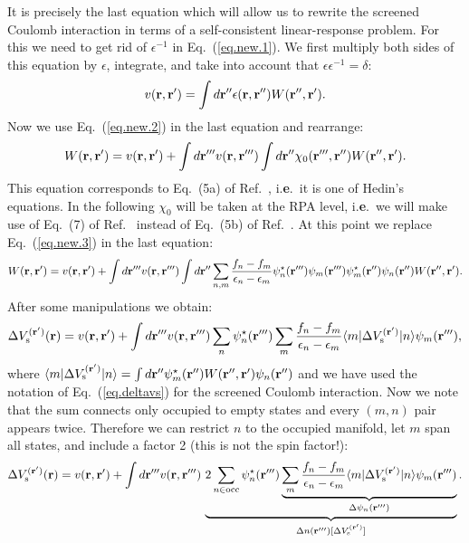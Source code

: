 \documentclass[12pt]{article}
\def\r{{\bf r}}
\def\rp{{\bf r}^\prime}
\def\rpp{{\bf r}^{\prime\prime}}
\def\rppp{{\bf r}^{\prime\prime\prime}}
\def\e{{\bf e}}
\begin{document}
It is precisely the last equation which will allow us to rewrite the screened Coulomb interaction
in terms of a self-consistent linear-response problem.
For this we need to get rid of $ \epsilon^{-1}$ in Eq.\ (\ref{eq.new.1}). We first multiply both
sides of this equation by $\epsilon$, integrate, and take into account that $\epsilon \epsilon^{-1} = \delta$:
 \begin{equation} \label{eq.new.4}
 v(\r,\rp) = \int d\rpp \epsilon(\r,\rpp) W(\rpp,\rp).  
 \end{equation}
Now we use Eq.\ (\ref{eq.new.2}) in the last equation and rearrange:
 \begin{equation} \label{eq.new.5}
 W(\r,\rp) =  v(\r,\rp) + \int d\rppp v(\r,\rppp) \int d\rpp \chi_0 (\rppp,\rpp) W(\rpp,\rp).
 \end{equation}
This equation corresponds to Eq.\ (5a) of Ref.\ \cite{hl86}, i.\e.\ it is
one of Hedin's equations. In the following $\chi_0$ will be taken at the
RPA level, i.\e.\ we will make use of Eq.\ (7) of Ref.\ \cite{hl86} instead
of Eq.\ (5b) of Ref.\ \cite{hl86}.
%
At this point we replace Eq.\ (\ref{eq.new.3}) in the last equation:
 \begin{equation} \label{eq.new.6}
 W(\r,\rp) =  v(\r,\rp) + \int d\rppp v(\r,\rppp) \int d\rpp \sum_{n,m} \frac{f_n-f_m}{\epsilon_n-\epsilon_m} \psi_n^\star (\rppp) \psi_m (\rppp) \psi_m^\star (\rpp) \psi_n (\rpp) W(\rpp,\rp).
 \end{equation}
After some manipulations we obtain:
 \begin{equation} \label{eq.new.7}
 \Delta V_{\rm s}^{(\rp)}(\r) =  v(\r,\rp) + \int d\rppp v(\r,\rppp) \sum_n \psi_n^\star (\rppp) \sum_m \frac{f_n-f_m}{\epsilon_n-\epsilon_m} 
 \langle m | \Delta V_{\rm s}^{(\rp)} | n \rangle \psi_m (\rppp),
 \end{equation}
where $\langle m | \Delta V_{\rm s}^{(\rp)} | n \rangle = \int d\rpp  \psi_m^\star (\rpp) W(\rpp,\rp) \psi_n (\rpp)$
and we have used the notation of Eq.\ (\ref{eq.deltavs}) for the screened Coulomb interaction.
Now we note that the sum connects only occupied to empty states and every $(m,n)$ pair appears twice. Therefore
we can restrict $n$ to the occupied manifold, let $m$ span all states, and include a factor 2 (this is not the spin factor!):
 \begin{equation} \label{eq.dyson0}
 \Delta V_{\rm s}^{(\rp)}(\r) =  v(\r,\rp) + \int d\rppp v(\r,\rppp) \, 
 \underbrace{2 \sum_{n \in {\rm occ}} \psi_n^\star (\rppp) 
 \underbrace{\sum_m \frac{f_n-f_m}{\epsilon_n-\epsilon_m}
 \langle m | \Delta V_{\rm s}^{(\rp)} | n \rangle \psi_m (\rppp)}_{\Delta \psi_n(\rppp)}}_{\Delta n(\rppp)[\Delta V_{\rm s}^{(\rp)}]}.
 \end{equation}
\end{document}
